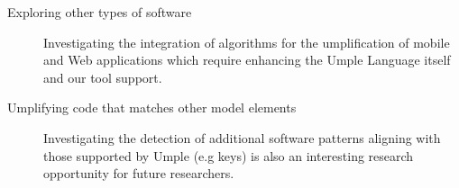 \begin{description}
\item[Exploring other types of software] Investigating the integration of algorithms for the umplification of mobile and Web applications which require enhancing the Umple Language itself and our tool support.

\item[Umplifying code that matches other model elements] Investigating the detection of additional software patterns aligning with those supported by Umple (e.g keys) is also an interesting research opportunity for future researchers.

\end{description}